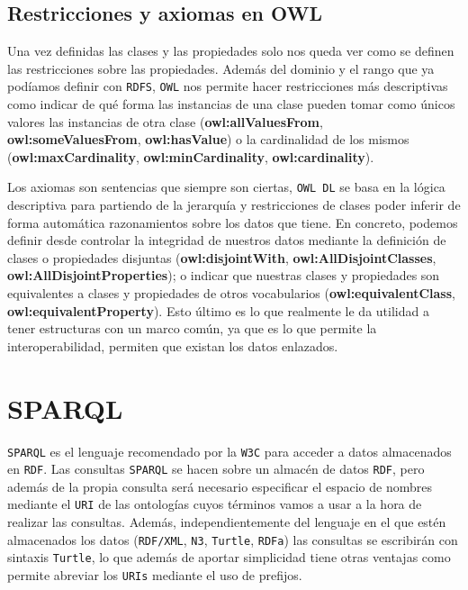\newpage
\subsection{Restricciones y axiomas en OWL}	
Una vez definidas las clases y las propiedades solo nos queda ver como se definen las restricciones sobre las propiedades. Además del dominio y el rango que ya podíamos definir con {\tt RDFS}, {\tt OWL} nos permite hacer restricciones más descriptivas como indicar de qué forma las instancias de una clase pueden tomar como únicos valores las instancias de otra clase (\textbf{owl:allValuesFrom}, \textbf{owl:someValuesFrom}, \textbf{owl:hasValue}) o la cardinalidad de los mismos (\textbf{owl:maxCardinality}, \textbf{owl:minCardinality}, \textbf{owl:cardinality}).

\bigskip
Los axiomas son sentencias que siempre son ciertas, {\tt OWL DL} se basa en la lógica descriptiva para partiendo de la jerarquía y restricciones de clases poder inferir de forma automática razonamientos sobre los datos que tiene. En concreto, podemos definir desde controlar la integridad de nuestros datos mediante la definición de clases o propiedades disjuntas (\textbf{owl:disjointWith}, \textbf{owl:AllDisjointClasses}, \textbf{owl:AllDisjointProperties}); o indicar que nuestras clases y propiedades son equivalentes a clases y propiedades de otros vocabularios (\textbf{owl:equivalentClass}, \textbf{owl:equivalentProperty}). Esto último es lo que realmente le da utilidad a tener estructuras con un marco común, ya que es lo que permite la interoperabilidad, permiten que existan los datos enlazados.

\section{SPARQL}

{\tt SPARQL} es el lenguaje recomendado por la {\tt W3C} para acceder a datos almacenados en {\tt RDF}. Las consultas {\tt SPARQL} se hacen sobre un almacén de datos {\tt RDF}, pero además de la propia consulta será necesario especificar el espacio de nombres mediante el {\tt URI} de las ontologías cuyos términos vamos a usar a la hora de realizar las consultas. Además, independientemente del lenguaje en el que estén almacenados los datos ({\tt RDF/XML}, {\tt N3}, {\tt Turtle}, {\tt RDFa}) las consultas se escribirán con sintaxis {\tt Turtle}, lo que además de aportar simplicidad tiene otras ventajas como permite abreviar los {\tt URIs} mediante el uso de prefijos.

